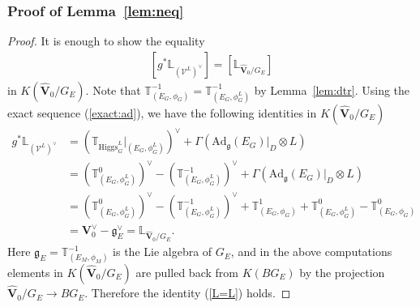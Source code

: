 \documentclass [11pt,oneside,a4paper,mathscr]{amsart}
\theoremstyle{definition}
\newcommand{\V}{\mathcal{V}}
\newcommand{\fg}{\mathfrak{g}}
\newcommand{\Ad}{\mathrm{Ad}}
\newcommand{\Hig}{\mathrm{Higgs}}
\begin{document}
\subsubsection{Proof of Lemma~\ref{lem:neq}}\label{subsub:2}
\begin{proof}
It is enough to show the equality  
\begin{align}\label{L=L}
[g^{\ast}\mathbb{L}_{(\V^L)^{\vee}}]=[\mathbb{L}_{\widehat{\mathbf{V}}_0/G_E}]
\end{align}
in $K(\widehat{\mathbf{V}}_0/G_E)$. 
Note that $\mathbb{T}^{-1}_{(E_G, \phi_G)}=\mathbb{T}^{-1}_{(E_G, \phi_G^{L})}$ by Lemma~\ref{lem:dtr}. 
Using the exact sequence (\ref{exact:ad}), we have 
the following identities in $K(\widehat{\mathbf{V}}_0/G_E)$
\begin{align*}
    g^{\ast}\mathbb{L}_{(\V^L)^{\vee}} &=
    (\mathbb{T}_{\Hig_G^{L}}|_{(E_G, \phi_G^{L})})^{\vee}+\Gamma(\Ad_{\fg}(E_G)|_{D}\otimes L) \\
    &=(\mathbb{T}^0_{(E_G, \phi_G^{L})})^{\vee}-(\mathbb{T}^{-1}_{(E_G, \phi_G^{L})})^{\vee}+\Gamma(\Ad_{\fg}(E_G)|_{D}\otimes L) \\
    &=(\mathbb{T}^0_{(E_G, \phi_G^{L})})^{\vee}-(\mathbb{T}^{-1}_{(E_G, \phi_G^{L})})^{\vee}
+\mathbb{T}_{(E_G, \phi_G)}^1+\mathbb{T}_{(E_G, \phi_G^{L})}^0-\mathbb{T}_{(E_G, \phi_G)}^0 \\
    &=\mathbf{V}^{\vee}_0-\mathfrak{g}_E^{\vee}=\mathbb{L}_{\widehat{\mathbf{V}}_0/G_E}. 
\end{align*}
Here $\mathfrak{g}_E=\mathbb{T}_{(E_M, \phi_M)}^{-1}$ is the Lie algebra of $G_E$, and in the above computations 
elements in $K(\widehat{\mathbf{V}}_0/G_E)$ are pulled back from $K(BG_E)$ 
by the projection $\widehat{\mathbf{V}}_0/G_E \to BG_E$. 
Therefore the identity (\ref{L=L}) holds. 
\end{proof}
\end{document}
